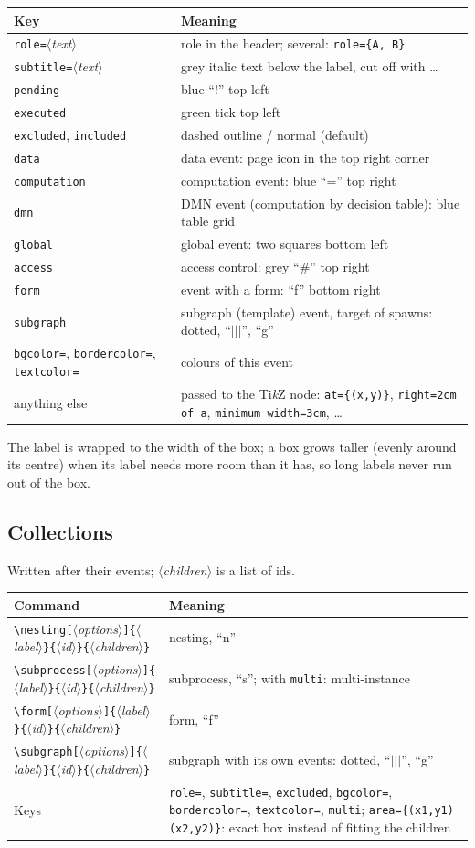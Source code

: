 \documentclass[a4paper,11pt]{article}
\newcommand\cs[1]{\texttt{\textbackslash#1}}
\newcommand\key[1]{\texttt{#1}}
\newcommand\meta[1]{\ensuremath{\langle}\textit{#1}\ensuremath{\rangle}}
\newcommand\marg[1]{\texttt{\{}\meta{#1}\texttt{\}}}
\newcommand\oarg[1]{\texttt{[}\meta{#1}\texttt{]}}
\begin{document}
\medskip
\begin{tabularx}{\linewidth}{@{}lL@{}}
\toprule
Key & Meaning\\
\midrule
\key{role=}\meta{text} & role in the header; several: \key{role=\{A, B\}}\\
\key{subtitle=}\meta{text} & grey italic text below the label, cut off with \dots\\
\key{pending} & blue ``!'' top left\\
\key{executed} & green tick top left\\
\key{excluded}, \key{included} & dashed outline / normal (default)\\
\key{data} & data event: page icon in the top right corner\\
\key{computation} & computation event: blue ``='' top right\\
\key{dmn} & DMN event (computation by decision table): blue table grid\\
\key{global} & global event: two squares bottom left\\
\key{access} & access control: grey ``\#'' top right\\
\key{form} & event with a form: ``f'' bottom right\\
\key{subgraph} & subgraph (template) event, target of spawns: dotted, ``$|||$'', ``g''\\
\key{bgcolor=}, \key{bordercolor=}, \key{textcolor=} & colours of this event\\
anything else & passed to the Ti\emph{k}Z node: \key{at=\{(x,y)\}},
  \key{right=2cm of a}, \key{minimum width=3cm}, \dots\\
\bottomrule
\end{tabularx}

The label is wrapped to the width of the box; a box grows taller (evenly
around its centre) when its label needs more room than it has, so long labels
never run out of the box.

\subsection{Collections}
Written after their events; \meta{children} is a list of ids.

\medskip
\begin{tabularx}{\linewidth}{@{}lL@{}}
\toprule
Command & Meaning\\
\midrule
\cs{nesting}\oarg{options}\marg{label}\marg{id}\marg{children} & nesting, ``n''\\
\cs{subprocess}\oarg{options}\marg{label}\marg{id}\marg{children} & subprocess, ``s'';
  with \key{multi}: multi-instance\\
\cs{form}\oarg{options}\marg{label}\marg{id}\marg{children} & form, ``f''\\
\cs{subgraph}\oarg{options}\marg{label}\marg{id}\marg{children} & subgraph with its
  own events: dotted, ``$|||$'', ``g''\\
\midrule
Keys & \key{role=}, \key{subtitle=}, \key{excluded}, \key{bgcolor=},
  \key{bordercolor=}, \key{textcolor=}, \key{multi};
  \key{area=\{(x1,y1)(x2,y2)\}}: exact box instead of fitting the children\\
\bottomrule
\end{tabularx}
\end{document}
